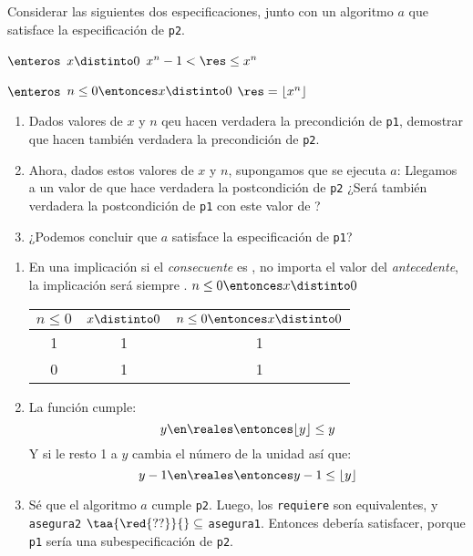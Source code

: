 \begin{enunciado}{\ejercicio}
  Considerar las siguientes dos especificaciones, junto con un algoritmo $a$
  que satisface la especificación de \texttt{p2}.\par
  {$\enteros$}
  {$x \distinto 0$}
  {$x^n - 1 < \res \leq x^n$}

  {$\enteros$}
  {$n\leq 0 \entonces x \distinto 0$}
  {$\res = \lfloor x^n \rfloor$}

  \begin{enumerate}[label=\alph*)]
    \item Dados valores de $x$ y $n$ qeu hacen verdadera la precondición de \texttt{p1}, demostrar que hacen también verdadera
          la precondición de \texttt{p2}.

    \item Ahora, dados estos valores de $x$ y $n$, supongamos que se ejecuta $a$: Llegamos a un valor de \res que hace
          verdadera la postcondición de \texttt{p2} ¿Será también verdadera la postcondición de \texttt{p1} con este valor de \res?

    \item ¿Podemos concluir que $a$ satisface la especificación de \texttt{p1}?
  \end{enumerate}
\end{enunciado}

\begin{enumerate}[label=\alph*)]
  \item En una implicación si el \textit{consecuente} es \verdadero, no importa el valor del \textit{antecedente}, la implicación será siempre \verdadero. $n \leq0 \entonces x \distinto 0$
        \begin{center}
          \begin{tabular}{|c|c|c|}
            \hline
            $n\leq 0$ & $x\distinto 0$ & $n \leq 0 \entonces x \distinto 0$ \\\hline
            1         & 1              & 1                                  \\
            0         & 1              & 1                                  \\\hline
          \end{tabular}
        \end{center}

  \item La función cumple:
        $$
          y \en \reales \entonces \lfloor y \rfloor \leq y
        $$
        Y si le resto 1 a $y$ cambia el número de la unidad así que:
        $$
          y - 1 \en \reales \entonces y - 1 \leq \lfloor y \rfloor
        $$

  \item Sé que el algoritmo $a$ cumple \texttt{p2}. Luego, los \texttt{requiere} son equivalentes, y \texttt{asegura2} $\taa{\red{??}}{}\subseteq$ \texttt{asegura1}. Entonces debería satisfacer,
        porque \texttt{p1} sería una subespecificación de \texttt{p2}.\par
\end{enumerate}
